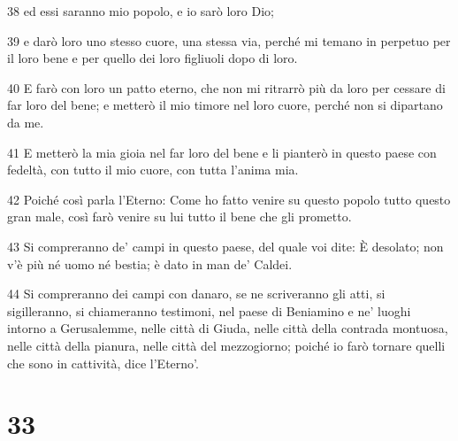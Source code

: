 \par 38 ed essi saranno mio popolo, e io sarò loro Dio;
\par 39 e darò loro uno stesso cuore, una stessa via, perché mi temano in perpetuo per il loro bene e per quello dei loro figliuoli dopo di loro.
\par 40 E farò con loro un patto eterno, che non mi ritrarrò più da loro per cessare di far loro del bene; e metterò il mio timore nel loro cuore, perché non si dipartano da me.
\par 41 E metterò la mia gioia nel far loro del bene e li pianterò in questo paese con fedeltà, con tutto il mio cuore, con tutta l'anima mia.
\par 42 Poiché così parla l'Eterno: Come ho fatto venire su questo popolo tutto questo gran male, così farò venire su lui tutto il bene che gli prometto.
\par 43 Si compreranno de' campi in questo paese, del quale voi dite: È desolato; non v'è più né uomo né bestia; è dato in man de' Caldei.
\par 44 Si compreranno dei campi con danaro, se ne scriveranno gli atti, si sigilleranno, si chiameranno testimoni, nel paese di Beniamino e ne' luoghi intorno a Gerusalemme, nelle città di Giuda, nelle città della contrada montuosa, nelle città della pianura, nelle città del mezzogiorno; poiché io farò tornare quelli che sono in cattività, dice l'Eterno'.

\chapter{33}

